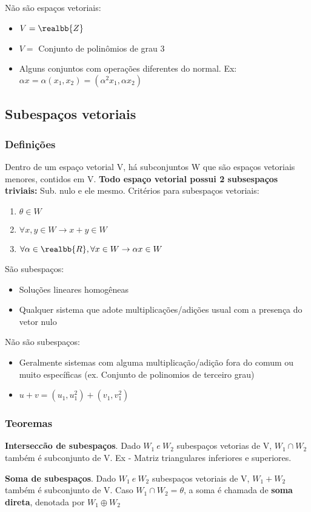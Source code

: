 \documentclass[letterpaper, 11pt]{article}
\begin{document}
Não são espaços vetoriais:
\begin{itemize}
\item \(V = \realbb{Z}\)
\item \(V =\) Conjunto de polinômios de grau 3
\item Alguns conjuntos com operações diferentes do normal. Ex: \(\alpha x = \alpha (x_1, x_2) = (\alpha ^2 x_1, \alpha x_2)\)
\end{itemize}

\subsection{Subespaços vetoriais}
\label{sec:org0a66d2c}
\subsubsection{Definições}
\label{sec:org099642e}
Dentro de um espaço vetorial V, há subconjuntos W que são espaços vetoriais menores, contidos em V. \textbf{Todo espaço vetorial possui 2 subsespaços triviais:} Sub. nulo e ele mesmo.
Critérios para subespaços vetoriais:
\begin{enumerate}
\item \(\theta \in W\)
\item \(\forall x, y \in W \rightarrow x + y \in W\)
\item \(\forall \alpha \in \realbb{R}, \forall x \in W \rightarrow \alpha x \in W\)
\end{enumerate}
São subespaços:
\begin{itemize}
\item Soluções lineares homogêneas
\item Qualquer sistema que adote multiplicações/adições usual com a presença do vetor nulo
\end{itemize}
Não são subespaços:
\begin{itemize}
\item Geralmente sistemas com alguma multiplicação/adição fora do comum ou muito específicas (ex. Conjunto de polinomios de terceiro grau)
\item \(u + v = (u_1 , u_1^2) + (v_1, v_1^2)\)
\end{itemize}
\subsubsection{Teoremas}
\label{sec:org84fa1ab}
\textbf{Interseccão de subespaços}. Dado \(W_1 \  e \  W_2\) subespaços vetorias de V, \(W_1 \cap W_2\) também é subconjunto de V. Ex - Matriz triangulares inferiores e superiores.

\textbf{Soma de subespaços}. Dado \(W_1 \  e \  W_2\) subespaços vetoriais de V, \(W_1 + W_2\) também é subconjunto de V. Caso \(W_1 \cap W_2 = \theta\), a soma é chamada de \textbf{soma direta}, denotada por \(W_1 \oplus W_2\)
\end{document}
